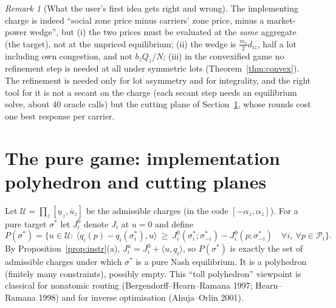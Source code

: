 \documentclass[11pt]{article}
\theoremstyle{definition}
\theoremstyle{remark}
\newtheorem{remark}[theorem]{Remark}
\newcommand{\cP}{\mathcal{P}}
\newcommand{\cU}{\mathcal{U}}
\newcommand{\ip}[2]{\langle #1,#2\rangle}
\begin{document}
\begin{remark}[What the user's first idea gets right and wrong]
The implementing charge is indeed ``social zone price minus carriers' zone price, minus a market-power wedge'', but (i) the two prices must be evaluated at the \emph{same} aggregate (the target), not at the unpriced equilibrium; (ii) the wedge is $\tfrac{m_z}{2}d_{iz}$, half a lot including own congestion, and not $b_zQ_z/N$; (iii) in the convexified game no refinement step is needed at all under symmetric lots (Theorem~\ref{thm:convex}). The refinement is needed only for lot asymmetry and for integrality, and the right tool for it is not a secant on the charge (each secant step needs an equilibrium solve, about $40$ oracle calls) but the cutting plane of Section~\ref{sec:pure}, whose rounds cost one best response per carrier.
\end{remark}

\section{The pure game: implementation polyhedron and cutting planes}\label{sec:pure}

Let $\cU=\prod_z[\underline u_z,\overline u_z]$ be the admissible charges (in the code $[-\alpha_z,\alpha_z]$). For a pure target $\sigma^*$ let $J^0_i$ denote $J_i$ at $u=0$ and define
\[P(\sigma^*)=\big\{u\in\cU:\ \ip{q_i(p)-q_i(\sigma^*_i)}{u}\ \ge\ J^0_i(\sigma^*_i;\sigma^*_{-i})-J^0_i(p;\sigma^*_{-i})\quad\forall i,\ \forall p\in\cP_i\big\}.\]
By Proposition~\ref{prop:instr}(a), $J^u_i=J^0_i+\ip{u}{q_i}$, so $P(\sigma^*)$ is exactly the set of admissible charges under which $\sigma^*$ is a pure Nash equilibrium. It is a polyhedron (finitely many constraints), possibly empty. This ``toll polyhedron'' viewpoint is classical for nonatomic routing (Bergendorff--Hearn--Ramana 1997; Hearn--Ramana 1998) and for inverse optimisation (Ahuja--Orlin 2001).
\end{document}
